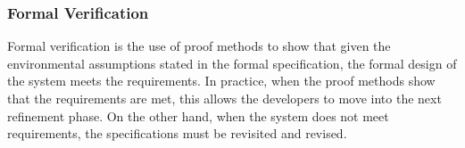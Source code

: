 \subsubsection{Formal Verification} 
Formal verification is the use of proof methods to show that given the environmental assumptions stated in the formal specification, the formal design of the system meets the requirements. In practice, when the proof methods show that the requirements are met, this allows the developers to move into the next refinement phase. On the other hand, when the system does not meet requirements, the specifications must be revisited and revised. 

